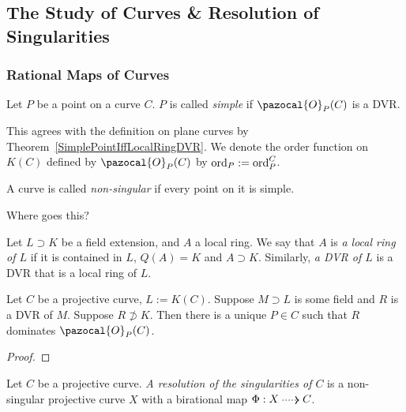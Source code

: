 \subsection{The Study of Curves \& Resolution of Singularities}
    \subsubsection{Rational Maps of Curves}
        \begin{definition}
            Let $P$ be a point on a curve $C$. $P$ is called \textit{simple} if $\pazocal{O}_P(C)$ is a DVR. 
        \end{definition}
        \begin{remark}
            This agrees with the definition on plane curves by Theorem~\ref{SimplePointIffLocalRingDVR}. We denote the order function on $K(C)$ defined by $\pazocal{O}_P(C)$ by $\mathrm{ord}_P:=\mathrm{ord}_P^C$. 
        \end{remark}
        \begin{definition}
            A curve is called \textit{non-singular} if every point on it is simple.
        \end{definition}
        {\Large Where goes this?}
        \begin{definition}
            Let $L\supset K$ be a field extension, and $A$ a local ring. We say that $A$ is \textit{a local ring of $L$} if it is contained in $L$, $Q(A)=K$ and $A\supset K$. Similarly, \textit{a DVR of $L$} is a DVR that is a local ring of $L$.  
        \end{definition}
        \begin{theorem}
            Let $C$ be a projective curve, $L:=K(C)$. Suppose $M\supset L$ is some field and $R$ is a DVR of $M$. Suppose $R\not\supset K$. Then there is a unique $P\in C$ such that $R$ dominates $\pazocal{O}_P(C)$. 
        \end{theorem}
        \begin{proof}
            
        \end{proof}
        \begin{corollary}
            
        \end{corollary}
        \begin{definition}
            Let $C$ be a projective curve. \textit{A resolution of the singularities of $C$} is a non-singular projective curve $X$ with a birational map $\Phi : X\dottedarrow C$. 
        \end{definition}
